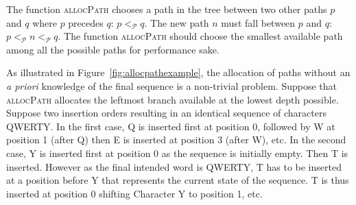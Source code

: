 \begin{algorithm}[h]
  
  \caption{\label{algo:crdtabstract}General outlines of a sequence with
    variable-size identifiers.}
\end{algorithm}

The function \textsc{allocPath} chooses a path in the tree between two other paths
$p$ and $q$ where $p$ precedes $q$: $p<_{\mathcal{P}}q$. The new path $n$ must
fall between $p$ and $q$: $p<_\mathcal{P}n<_\mathcal{P}q$.
The function \textsc{allocPath} should choose the smallest available path among all
the possible paths for performance sake.

\begin{figure*}
  \centering
  \hspace{50pt}
  \caption{\label{fig:allocpathexample} Two trees filled with the resulting
    identifiers of two different permutations resulting in an identical sequence
    QWERTY. The function \textsc{allocPath} allocates the leftmost branch in the
    tree. All paths of the optimal case have a length of 1 while the tree of the
    worst case grows up to a depth of 6.}
\end{figure*}

As illustrated in Figure~\ref{fig:allocpathexample}, the allocation of paths
without an \emph{a priori} knowledge of the final sequence is a non-trivial
problem.  Suppose that \textsc{allocPath} allocates the leftmost branch
available at the lowest depth possible. Suppose two insertion orders resulting
in an identical sequence of characters QWERTY.  In the first case, Q is inserted
first at position 0, followed by W at position 1 (after Q) then E is inserted at
position 3 (after W), etc.  In the second case, Y is inserted first at position
0 as the sequence is initially empty. Then T is inserted. However as the final
intended word is QWERTY, T has to be inserted at a position before Y that
represents the current state of the sequence. T is thus inserted at position 0
shifting Character Y to position 1, etc.


